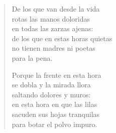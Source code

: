 \documentclass[12pt]{article}
\begin{document}
\begin{verse}
De los que van desde la vida\\
rotas las manos doloridas\\
en todas las zarzas ajenas:\\
de los que en estas horas quietas\\
no tienen madres ni poetas\\
para la pena.  

Porque la frente en esta hora\\
se dobla y la mirada llora\\
saltando dolores y muros:\\
en esta hora en que las lilas\\
sacuden sus hojas tranquilas\\
para botar el polvo impuro.

\end{verse}
\end{document}
